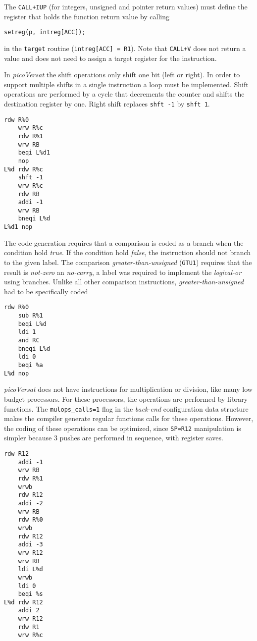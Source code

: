 The {\tt CALL+IUP} (for integers, unsigned and pointer
return values) must define the register that holds the
function return value by calling
\begin{Verbatim}[baselinestretch=1.2]
setreg(p, intreg[ACC]);
\end{Verbatim}

in the {\tt target} routine ({\tt intreg[ACC] = R1}).
Note that {\tt CALL+V} does not return a value and
does not need to assign a target register for the instruction.

In {\it picoVersat} the shift operations only shift
one bit (left or right).
In order to support multiple shifts in a single
instruction a loop must be implemented.
Shift operations are performed by a cycle that decrements
the counter and shifts the destination register by one.
Right shift replaces {\tt shft -1} by {\tt shft 1}.
\begin{Verbatim}[baselinestretch=1.2]
    rdw R%0
    wrw R%c
    rdw R%1
    wrw RB
    beqi L%d1
    nop
L%d rdw R%c
    shft -1
    wrw R%c
    rdw RB
    addi -1
    wrw RB
    bneqi L%d
L%d1 nop
\end{Verbatim}

The code generation requires that a comparison is coded
as a branch when the condition hold {\em true}.
If the condition hold {\em false}, the instruction should
not branch to the given label.
The comparison {\em greater-than-unsigned} ({\tt GTU1})
requires that the result is {\em not-zero} an {\em no-carry},
a label was required to implement the {\em logical-or}
using branches.
Unlike all other comparison instructions,
{\em greater-than-unsigned} had to be specifically coded
\begin{Verbatim}[baselinestretch=1.2]
    rdw R%0
    sub R%1
    beqi L%d
    ldi 1
    and RC
    bneqi L%d
    ldi 0
    beqi %a
L%d nop
\end{Verbatim}

{\it picoVersat} does not have instructions for
multiplication or division, like many low budget processors.
For these processors, the operations are performed by library
functions.
The {\tt mulops\_calls=1} flag in the {\it back-end} configuration
data structure makes the compiler generate regular functions
calls for these operations.
However, the coding of these operations can be optimized,
since {\tt SP=R12} manipulation is simpler because $3$
pushes are performed in sequence, with register saves.
\begin{Verbatim}[baselinestretch=1.2]
    rdw R12
    addi -1
    wrw RB
    rdw R%1
    wrwb
    rdw R12
    addi -2
    wrw RB
    rdw R%0
    wrwb
    rdw R12
    addi -3
    wrw R12
    wrw RB
    ldi L%d
    wrwb
    ldi 0
    beqi %s
L%d rdw R12
    addi 2
    wrw R12
    rdw R1
    wrw R%c
\end{Verbatim}

